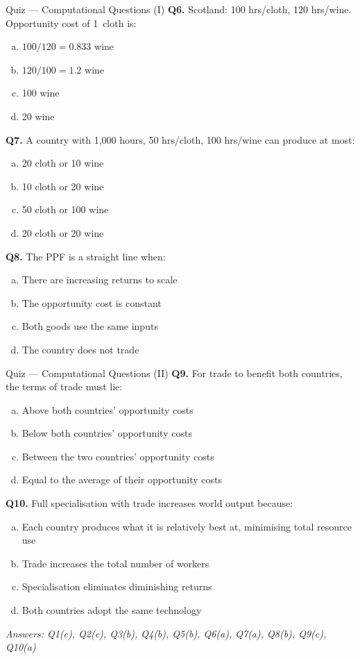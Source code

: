 \documentclass[aspectratio=169, 10pt]{beamer}
\begin{document}
\begin{frame}{Quiz --- Computational Questions (I)}
\textbf{Q6.} Scotland: 100 hrs/cloth, 120 hrs/wine.
Opportunity cost of 1~cloth is:
\begin{enumerate}[(a)]
  \item $100/120 = 0.833$ wine
  \item $120/100 = 1.2$ wine
  \item 100 wine
  \item 20 wine
\end{enumerate}
\vspace{0.5em}
\textbf{Q7.} A country with 1,000 hours, 50 hrs/cloth,
100 hrs/wine can produce at most:
\begin{enumerate}[(a)]
  \item 20 cloth or 10 wine
  \item 10 cloth or 20 wine
  \item 50 cloth or 100 wine
  \item 20 cloth or 20 wine
\end{enumerate}
\vspace{0.5em}
\textbf{Q8.} The PPF is a straight line when:
\begin{enumerate}[(a)]
  \item There are increasing returns to scale
  \item The opportunity cost is constant
  \item Both goods use the same inputs
  \item The country does not trade
\end{enumerate}
\end{frame}

\begin{frame}{Quiz --- Computational Questions (II)}
\textbf{Q9.} For trade to benefit both countries, the terms of trade
must lie:
\begin{enumerate}[(a)]
  \item Above both countries' opportunity costs
  \item Below both countries' opportunity costs
  \item Between the two countries' opportunity costs
  \item Equal to the average of their opportunity costs
\end{enumerate}
\vspace{0.5em}
\textbf{Q10.} Full specialisation with trade increases world output
because:
\begin{enumerate}[(a)]
  \item Each country produces what it is relatively best at,
        minimising total resource use
  \item Trade increases the total number of workers
  \item Specialisation eliminates diminishing returns
  \item Both countries adopt the same technology
\end{enumerate}
\vspace{1em}
\begin{center}
\small\textit{Answers: Q1(c), Q2(c), Q3(b), Q4(b), Q5(b),
Q6(a), Q7(a), Q8(b), Q9(c), Q10(a)}
\end{center}
\end{frame}
\end{document}
